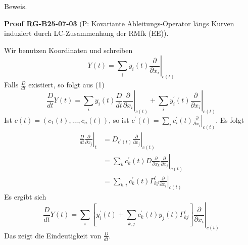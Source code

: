 \documentclass[10pt, letterpaper]{article}
\newcommand{\CustomHeading}[3]{%
  \par\medskip\noindent%
  \textbf{#1 #2} \textnormal{(#3)}.\enskip%
}
\newenvironment{PROOF}[2]{\begin{unitbox}\CustomHeading{Proof}{#1}{#2}}{\end{unitbox}}
\begin{document}
Beweis. 



\begin{PROOF}{RG-B25-07-03}{P: Kovariante Ableitungs-Operator längs Kurven induziert durch LC-Zusammenhang der RMfk (EE)}
Wir benutzen Koordinaten und schreiben
$$
Y(t)=\left.\sum_{i} y_{i}(t) \frac{\partial}{\partial x_{i}}\right|_{c(t)}
$$
Falls $\frac{D}{d t}$ existiert, so folgt aus (1)
$$
\frac{D}{d t} Y(t)=\left.\sum_{i} y_{i}(t) \frac{D}{d t} \frac{\partial}{\partial x_{i}}\right|_{c(t)}+\left.\sum_{i} y_{i}^{\prime}(t) \frac{\partial}{\partial x_{i}}\right|_{c(t)}
$$
Ist $c(t)=\left(c_{1}(t), \ldots, c_{n}(t)\right)$, so ist $c^{\prime}(t)=\left.\sum_{i} c_{i}^{\prime}(t) \frac{\partial}{\partial x_{i}}\right|_{c(t)}$. Es folgt
$$
\begin{aligned}
\left.\frac{D}{d t} \frac{\partial}{\partial x_{j}}\right|_{t} & =\left.D_{c^{\prime}(t)} \frac{\partial}{\partial x_{j}}\right|_{c(t)} \\
& =\left.\sum_{k} c_{k}^{\prime}(t) D \frac{\partial}{\partial x_{k}} \frac{\partial}{\partial x_{j}}\right|_{c(t)} \\
& =\left.\sum_{k, i} c_{k}^{\prime}(t) \Gamma_{k j}^{i} \frac{\partial}{\partial x_{i}}\right|_{c(t)}
\end{aligned}
$$
Es ergibt sich
\begin{equation*}
\frac{D}{d t} Y(t)=\left.\sum_{i}\left[y_{i}^{\prime}(t)+\sum_{k, j} c_{k}^{\prime}(t) y_{j}(t) \Gamma_{k j}^{i}\right] \frac{\partial}{\partial x_{i}}\right|_{c(t)} \tag{4}
\end{equation*}
Das zeigt die Eindeutigkeit von $\frac{D}{d t}$. 


\end{PROOF}
\end{document}
